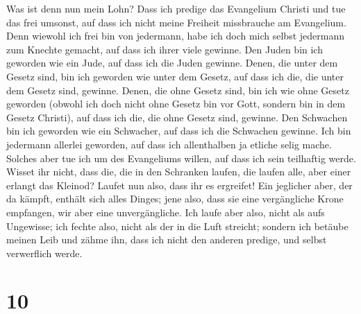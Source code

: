  Was ist denn nun mein Lohn? Dass ich predige das
Evangelium Christi und tue das frei umsonst, auf dass ich nicht meine
Freiheit missbrauche am Evangelium.  Denn wiewohl ich
frei bin von jedermann, habe ich doch mich selbst jedermann zum Knechte
gemacht, auf dass ich ihrer viele gewinne.  Den Juden bin
ich geworden wie ein Jude, auf dass ich die Juden gewinne. Denen, die
unter dem Gesetz sind, bin ich geworden wie unter dem Gesetz, auf dass
ich die, die unter dem Gesetz sind, gewinne.  Denen, die
ohne Gesetz sind, bin ich wie ohne Gesetz geworden (obwohl ich doch
nicht ohne Gesetz bin vor Gott, sondern bin in dem Gesetz Christi), auf
dass ich die, die ohne Gesetz sind, gewinne.  Den
Schwachen bin ich geworden wie ein Schwacher, auf dass ich die Schwachen
gewinne. Ich bin jedermann allerlei geworden, auf dass ich allenthalben
ja etliche selig mache.  Solches aber tue ich um des
Evangeliums willen, auf dass ich sein teilhaftig werde. 
Wisset ihr nicht, dass die, die in den Schranken laufen, die laufen
alle, aber einer erlangt das Kleinod? Laufet nun also, dass ihr es
ergreifet!  Ein jeglicher aber, der da kämpft, enthält
sich alles Dinges; jene also, dass sie eine vergängliche Krone
empfangen, wir aber eine unvergängliche.  Ich laufe aber
also, nicht als aufs Ungewisse; ich fechte also, nicht als der in die
Luft streicht;  sondern ich betäube meinen Leib und zähme
ihn, dass ich nicht den anderen predige, und selbst verwerflich werde.

\hypertarget{section-9}{%
\section{10}\label{section-9}}

